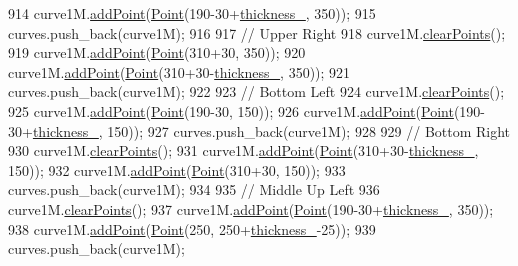 \begin{DoxyCode}
914     curve1M.\mbox{\hyperlink{class_bezier_curve_a38d16c18b36ae45619b05e26e226cf34}{addPoint}}(\mbox{\hyperlink{class_point}{Point}}(190-30+\mbox{\hyperlink{class_font_v1_aed8040e76be9a52833627b92f0fb4e5f}{thickness\_}}, 350));
915     curves.push\_back(curve1M);
916 
917     \textcolor{comment}{// Upper Right}
918     curve1M.\mbox{\hyperlink{class_bezier_curve_a0ba8ce66d5af5971ae6a1b506029728e}{clearPoints}}();
919     curve1M.\mbox{\hyperlink{class_bezier_curve_a38d16c18b36ae45619b05e26e226cf34}{addPoint}}(\mbox{\hyperlink{class_point}{Point}}(310+30, 350));
920     curve1M.\mbox{\hyperlink{class_bezier_curve_a38d16c18b36ae45619b05e26e226cf34}{addPoint}}(\mbox{\hyperlink{class_point}{Point}}(310+30-\mbox{\hyperlink{class_font_v1_aed8040e76be9a52833627b92f0fb4e5f}{thickness\_}}, 350));
921     curves.push\_back(curve1M);
922 
923     \textcolor{comment}{// Bottom Left}
924     curve1M.\mbox{\hyperlink{class_bezier_curve_a0ba8ce66d5af5971ae6a1b506029728e}{clearPoints}}();
925     curve1M.\mbox{\hyperlink{class_bezier_curve_a38d16c18b36ae45619b05e26e226cf34}{addPoint}}(\mbox{\hyperlink{class_point}{Point}}(190-30, 150));
926     curve1M.\mbox{\hyperlink{class_bezier_curve_a38d16c18b36ae45619b05e26e226cf34}{addPoint}}(\mbox{\hyperlink{class_point}{Point}}(190-30+\mbox{\hyperlink{class_font_v1_aed8040e76be9a52833627b92f0fb4e5f}{thickness\_}}, 150));
927     curves.push\_back(curve1M);
928 
929     \textcolor{comment}{// Bottom Right}
930     curve1M.\mbox{\hyperlink{class_bezier_curve_a0ba8ce66d5af5971ae6a1b506029728e}{clearPoints}}();
931     curve1M.\mbox{\hyperlink{class_bezier_curve_a38d16c18b36ae45619b05e26e226cf34}{addPoint}}(\mbox{\hyperlink{class_point}{Point}}(310+30-\mbox{\hyperlink{class_font_v1_aed8040e76be9a52833627b92f0fb4e5f}{thickness\_}}, 150));
932     curve1M.\mbox{\hyperlink{class_bezier_curve_a38d16c18b36ae45619b05e26e226cf34}{addPoint}}(\mbox{\hyperlink{class_point}{Point}}(310+30, 150));
933     curves.push\_back(curve1M);
934 
935     \textcolor{comment}{// Middle Up Left}
936     curve1M.\mbox{\hyperlink{class_bezier_curve_a0ba8ce66d5af5971ae6a1b506029728e}{clearPoints}}();
937     curve1M.\mbox{\hyperlink{class_bezier_curve_a38d16c18b36ae45619b05e26e226cf34}{addPoint}}(\mbox{\hyperlink{class_point}{Point}}(190-30+\mbox{\hyperlink{class_font_v1_aed8040e76be9a52833627b92f0fb4e5f}{thickness\_}}, 350));
938     curve1M.\mbox{\hyperlink{class_bezier_curve_a38d16c18b36ae45619b05e26e226cf34}{addPoint}}(\mbox{\hyperlink{class_point}{Point}}(250, 250+\mbox{\hyperlink{class_font_v1_aed8040e76be9a52833627b92f0fb4e5f}{thickness\_}}-25));
939     curves.push\_back(curve1M);

\end{DoxyCode}

